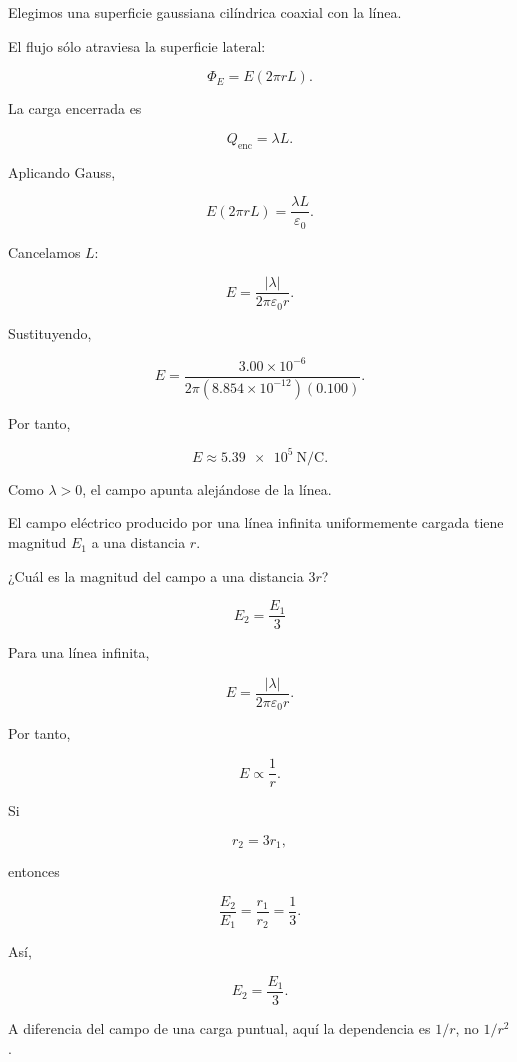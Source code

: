 \begin{explicacion}

Elegimos una superficie gaussiana cilíndrica coaxial con la línea.

El flujo sólo atraviesa la superficie lateral:

\[
\Phi_E=E(2\pi rL).
\]

La carga encerrada es

\[
Q_{\text{enc}}=\lambda L.
\]

Aplicando Gauss,

\[
E(2\pi rL)=\frac{\lambda L}{\varepsilon_0}.
\]

Cancelamos \(L\):

\[
E=\frac{|\lambda|}{2\pi\varepsilon_0r}.
\]

Sustituyendo,

\[
E=
\frac{3.00\times10^{-6}}
{2\pi(8.854\times10^{-12})(0.100)}.
\]

Por tanto,

\[
\boxed{E\approx\SI{5.39e5}{\newton\per\coulomb}}.
\]

Como \(\lambda>0\), el campo apunta alejándose de la línea.

\end{explicacion}


\begin{ejercicio}

El campo eléctrico producido por una línea infinita uniformemente cargada tiene
magnitud \(E_1\) a una distancia \(r\).

¿Cuál es la magnitud del campo a una distancia \(3r\)?

\end{ejercicio}

\begin{respuesta}

\[
\boxed{E_2=\frac{E_1}{3}}
\]

\end{respuesta}

\begin{explicacion}

Para una línea infinita,

\[
E=\frac{|\lambda|}{2\pi\varepsilon_0r}.
\]

Por tanto,

\[
E\propto\frac{1}{r}.
\]

Si

\[
r_2=3r_1,
\]

entonces

\[
\frac{E_2}{E_1}
=
\frac{r_1}{r_2}
=
\frac13.
\]

Así,

\[
\boxed{E_2=\frac{E_1}{3}}.
\]

A diferencia del campo de una carga puntual, aquí la dependencia es \(1/r\), no
\(1/r^2\).

\end{explicacion}


